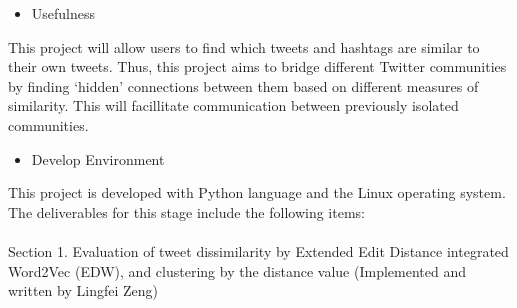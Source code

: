 \documentclass[10pt]{article}
\begin{document}
\begin{itemize}
	\item Usefulness
\end{itemize}
This project will allow users to find which tweets and hashtags are similar to their own tweets. Thus, this project aims to bridge different Twitter communities by finding ‘hidden’ connections between them based on different measures of similarity. This will facillitate communication between previously isolated communities.
\begin{itemize}
	\item Develop Environment
\end{itemize}	
This project is developed with Python language and the Linux operating system. \\
The deliverables for this stage include the following items:\\\\
Section 1. Evaluation of tweet dissimilarity by Extended Edit Distance integrated Word2Vec (EDW), and clustering by the distance value (Implemented and written by Lingfei Zeng)
\end{document}
